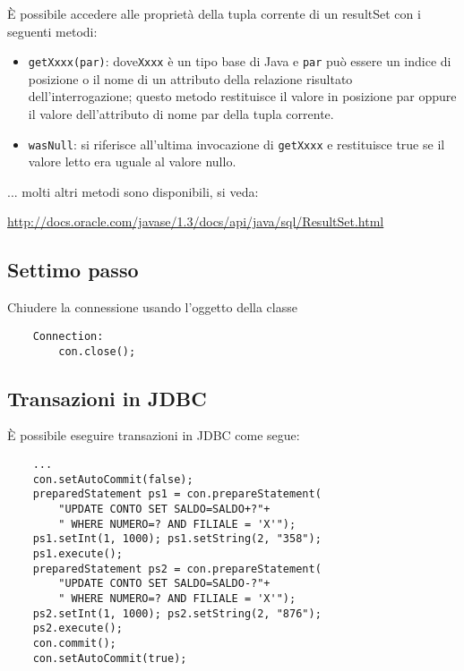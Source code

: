 \documentclass[a4paper, 10pt]{article}
\theoremstyle{definition}
\begin{document}
				È possibile accedere alle proprietà della tupla
				corrente di un resultSet con i seguenti metodi:
				
				\begin{itemize}
					\item \lstinline|getXxxx(par)|: dove\lstinline|Xxxx|
					 è un tipo base di Java e \lstinline|par| può
					essere un indice di posizione o il nome di un attributo della relazione
					risultato dell'interrogazione; questo metodo restituisce il valore in
					posizione par oppure il valore dell'attributo di nome par della tupla
					corrente.
					\item \lstinline|wasNull|: 
					si riferisce all'ultima invocazione di \lstinline|getXxxx| e
					restituisce true se il valore letto era uguale al valore nullo.
				\end{itemize}
				
				... molti altri metodi sono disponibili, si veda:
				
		\href{http://docs.oracle.com/javase/1.3/docs/api/java/sql/ResultSet.html}{http://docs.oracle.com/javase/1.3/docs/api/java/sql/ResultSet.html}
		
			\subsection*{Settimo passo}
				Chiudere la connessione usando l'oggetto della classe
				\begin{lstlisting}
	Connection:
		con.close();
				\end{lstlisting}
				
	\subsection{Transazioni in JDBC}
		È possibile eseguire transazioni in JDBC come
		segue:
		\begin{lstlisting}
	...
	con.setAutoCommit(false);
	preparedStatement ps1 = con.prepareStatement(
		"UPDATE CONTO SET SALDO=SALDO+?"+
		" WHERE NUMERO=? AND FILIALE = 'X'");
	ps1.setInt(1, 1000); ps1.setString(2, "358");
	ps1.execute();
	preparedStatement ps2 = con.prepareStatement(	
		"UPDATE CONTO SET SALDO=SALDO-?"+
		" WHERE NUMERO=? AND FILIALE = 'X'");
	ps2.setInt(1, 1000); ps2.setString(2, "876");
	ps2.execute();
	con.commit();
	con.setAutoCommit(true);
		\end{lstlisting}
		
\end{document}
